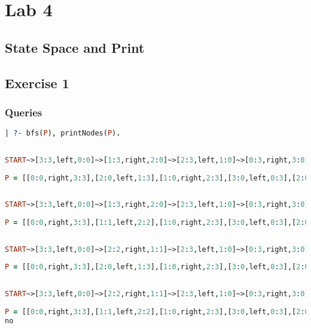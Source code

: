 \section{Lab 4}
\subsection{State Space and Print}


\subsection{Exercise 1}

\subsubsection{Queries}
\begin{lstlisting}[language=Prolog, breaklines]
| ?- bfs(P), printNodes(P).
  
  
START~>[3:3,left,0:0]~>[1:3,right,2:0]~>[2:3,left,1:0]~>[0:3,right,3:0]~>[1:3,left,2:0]~>[1:1,right,2:2]~>[2:2,left,1:1]~>[2:0,right,1:3]~>[3:0,left,0:3]~>[1:0,right,2:3]~>[2:0,left,1:3]~>[0:0,right,3:3]~>~>END.
  
P = [[0:0,right,3:3],[2:0,left,1:3],[1:0,right,2:3],[3:0,left,0:3],[2:0,right,1:3],[2:2,left,1:1],[1:1,right,2:2],[1:3,left,2:0],[0:3,right,3:0],[2:3,left,1:0],[1:3,right,2:0],[3:3,left,0:0]] ? ;
  
  
START~>[3:3,left,0:0]~>[1:3,right,2:0]~>[2:3,left,1:0]~>[0:3,right,3:0]~>[1:3,left,2:0]~>[1:1,right,2:2]~>[2:2,left,1:1]~>[2:0,right,1:3]~>[3:0,left,0:3]~>[1:0,right,2:3]~>[1:1,left,2:2]~>[0:0,right,3:3]~>~>END.
  
P = [[0:0,right,3:3],[1:1,left,2:2],[1:0,right,2:3],[3:0,left,0:3],[2:0,right,1:3],[2:2,left,1:1],[1:1,right,2:2],[1:3,left,2:0],[0:3,right,3:0],[2:3,left,1:0],[1:3,right,2:0],[3:3,left,0:0]] ? ;
  
  
START~>[3:3,left,0:0]~>[2:2,right,1:1]~>[2:3,left,1:0]~>[0:3,right,3:0]~>[1:3,left,2:0]~>[1:1,right,2:2]~>[2:2,left,1:1]~>[2:0,right,1:3]~>[3:0,left,0:3]~>[1:0,right,2:3]~>[2:0,left,1:3]~>[0:0,right,3:3]~>~>END.
  
P = [[0:0,right,3:3],[2:0,left,1:3],[1:0,right,2:3],[3:0,left,0:3],[2:0,right,1:3],[2:2,left,1:1],[1:1,right,2:2],[1:3,left,2:0],[0:3,right,3:0],[2:3,left,1:0],[2:2,right,1:1],[3:3,left,0:0]] ? ;
  
  
START~>[3:3,left,0:0]~>[2:2,right,1:1]~>[2:3,left,1:0]~>[0:3,right,3:0]~>[1:3,left,2:0]~>[1:1,right,2:2]~>[2:2,left,1:1]~>[2:0,right,1:3]~>[3:0,left,0:3]~>[1:0,right,2:3]~>[1:1,left,2:2]~>[0:0,right,3:3]~>~>END.
  
P = [[0:0,right,3:3],[1:1,left,2:2],[1:0,right,2:3],[3:0,left,0:3],[2:0,right,1:3],[2:2,left,1:1],[1:1,right,2:2],[1:3,left,2:0],[0:3,right,3:0],[2:3,left,1:0],[2:2,right,1:1],[3:3,left,0:0]] ? ;
no
\end{lstlisting}

